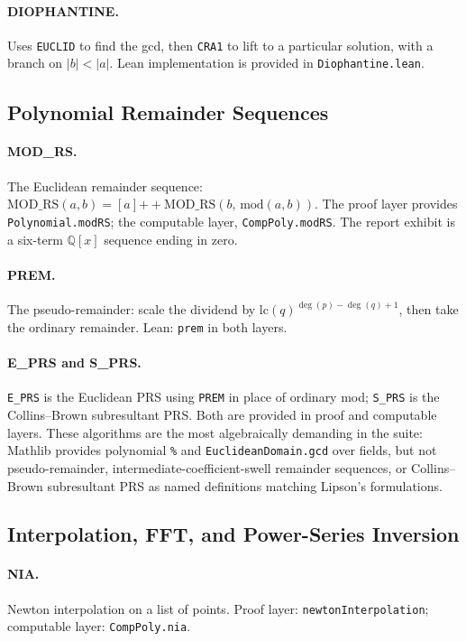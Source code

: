 \documentclass[11pt,a4paper]{article}
\begin{document}
\paragraph{DIOPHANTINE.} Uses \texttt{EUCLID} to find the gcd, then \texttt{CRA1} to lift to a particular solution, with a branch on $|b| < |a|$. Lean implementation is provided in \texttt{Diophantine.lean}.

\subsection{Polynomial Remainder Sequences}
\paragraph{MOD\_RS.} The Euclidean remainder sequence: $\mathrm{MOD\_RS}(a, b) = [a] \mathbin{+\!\!+} \mathrm{MOD\_RS}(b,\, \mathrm{mod}(a, b))$. The proof layer provides \texttt{Polynomial.modRS}; the computable layer, \texttt{CompPoly.modRS}. The report exhibit is a six-term $\mathbb{Q}[x]$ sequence ending in zero.

\paragraph{PREM.} The pseudo-remainder: scale the dividend by $\mathrm{lc}(q)^{\deg(p) - \deg(q) + 1}$, then take the ordinary remainder. Lean: \texttt{prem} in both layers.

\paragraph{E\_PRS and S\_PRS.} \texttt{E\_PRS} is the Euclidean PRS using \texttt{PREM} in place of ordinary mod; \texttt{S\_PRS} is the Collins–Brown subresultant PRS. Both are provided in proof and computable layers. These algorithms are the most algebraically demanding in the suite: Mathlib provides polynomial \texttt{\%} and \texttt{EuclideanDomain.gcd} over fields, but not pseudo-remainder, intermediate-coefficient-swell remainder sequences, or Collins–Brown subresultant PRS as named definitions matching Lipson's formulations.

\subsection{Interpolation, FFT, and Power-Series Inversion}
\paragraph{NIA.} Newton interpolation on a list of points. Proof layer: \texttt{newtonInterpolation}; computable layer: \texttt{CompPoly.nia}.
\end{document}
